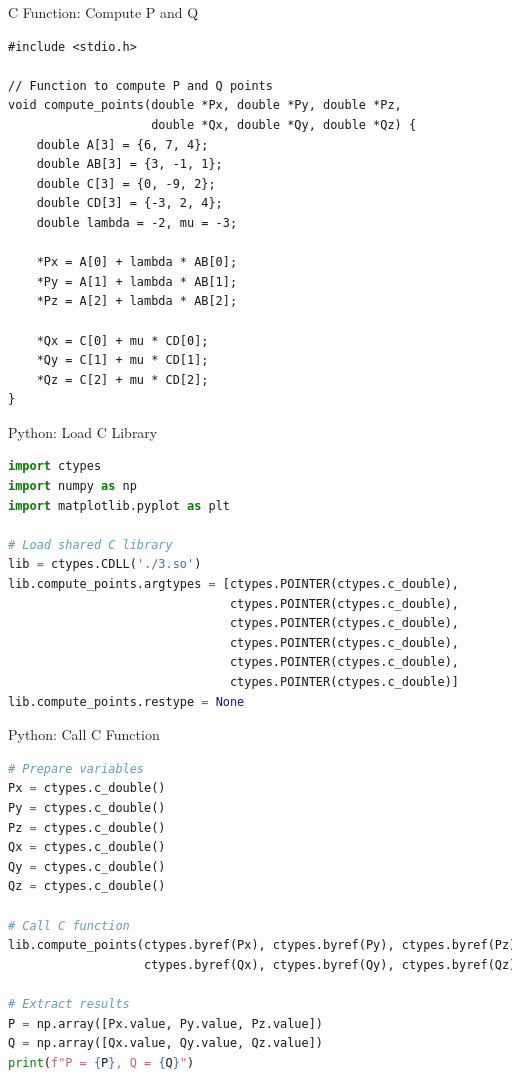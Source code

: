\documentclass{beamer}
\begin{document}
\begin{frame}[fragile]{C Function: Compute P and Q}
\begin{lstlisting}
#include <stdio.h>

// Function to compute P and Q points
void compute_points(double *Px, double *Py, double *Pz,
                    double *Qx, double *Qy, double *Qz) {
    double A[3] = {6, 7, 4};
    double AB[3] = {3, -1, 1};
    double C[3] = {0, -9, 2};
    double CD[3] = {-3, 2, 4};
    double lambda = -2, mu = -3;

    *Px = A[0] + lambda * AB[0];
    *Py = A[1] + lambda * AB[1];
    *Pz = A[2] + lambda * AB[2];

    *Qx = C[0] + mu * CD[0];
    *Qy = C[1] + mu * CD[1];
    *Qz = C[2] + mu * CD[2];
}
\end{lstlisting}

\end{frame}

\begin{frame}[fragile]{Python: Load C Library}
\begin{lstlisting}[language=Python]
import ctypes
import numpy as np
import matplotlib.pyplot as plt

# Load shared C library
lib = ctypes.CDLL('./3.so')
lib.compute_points.argtypes = [ctypes.POINTER(ctypes.c_double),
                               ctypes.POINTER(ctypes.c_double),
                               ctypes.POINTER(ctypes.c_double),
                               ctypes.POINTER(ctypes.c_double),
                               ctypes.POINTER(ctypes.c_double),
                               ctypes.POINTER(ctypes.c_double)]
lib.compute_points.restype = None
\end{lstlisting}
\end{frame}

\begin{frame}[fragile]{Python: Call C Function}
\begin{lstlisting}[language=Python]
# Prepare variables
Px = ctypes.c_double()
Py = ctypes.c_double()
Pz = ctypes.c_double()
Qx = ctypes.c_double()
Qy = ctypes.c_double()
Qz = ctypes.c_double()

# Call C function
lib.compute_points(ctypes.byref(Px), ctypes.byref(Py), ctypes.byref(Pz),
                   ctypes.byref(Qx), ctypes.byref(Qy), ctypes.byref(Qz))

# Extract results
P = np.array([Px.value, Py.value, Pz.value])
Q = np.array([Qx.value, Qy.value, Qz.value])
print(f"P = {P}, Q = {Q}")
\end{lstlisting}
\end{frame}
\end{document}
